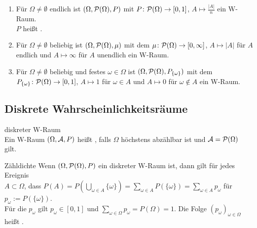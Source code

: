 \begin{Bsp}
    \begin{enumerate}
        \item
        Für $\Omega \not= \emptyset$ endlich ist $(\Omega, \P(\Omega), P)$ mit
        $P\colon \P(\Omega) \rightarrow [0, 1]$, $A \mapsto \frac{|A|}{n}$ ein W-Raum.\\
        $P$ heißt .
        
        \item
        Für $\Omega \not= \emptyset$ beliebig ist $(\Omega, \P(\Omega), \mu)$
        mit dem 
        $\mu\colon \P(\Omega) \rightarrow [0, \infty]$, $A \mapsto |A|$ für $A$ endlich und
        $A \mapsto \infty$ für $A$ unendlich ein W-Raum.
        
        \item
        Für $\Omega \not= \emptyset$ beliebig und festes $\omega \in \Omega$ ist
        $(\Omega, \P(\Omega), P_{\{\omega\}})$ mit dem \\
        $P_{\{\omega\}}\colon \P(\Omega) \rightarrow [0, 1]$,
        $A \mapsto 1$ für $\omega \in A$ und $A \mapsto 0$ für $\omega \notin A$ ein W-Raum.
    \end{enumerate}
\end{Bsp}

\subsection{%
    Diskrete Wahrscheinlichkeitsräume%
}

\begin{Def}{diskreter W-Raum}\\
    Ein W-Raum $(\Omega, \A, P)$ heißt , falls $\Omega$ höchstens abzählbar ist
    und $\A = \P(\Omega)$ gilt.
\end{Def}

\begin{Def}{Zähldichte}
    Wenn $(\Omega, \P(\Omega), P)$ ein diskreter W-Raum ist, dann gilt für jedes Ereignis\\
    $A \subset \Omega$, dass $P(A) = P(\bigcup_{\omega \in A} \{\omega\}) =
    \sum_{\omega \in A} P(\{\omega\}) = \sum_{\omega \in A} p_\omega$
    für $p_\omega := P(\{\omega\})$.\\
    Für die $p_\omega$ gilt $p_\omega \in [0, 1]$ und
    $\sum_{\omega \in \Omega} p_\omega = P(\Omega) = 1$.
    Die Folge $(p_\omega)_{\omega \in \Omega}$ heißt .
\end{Def}

